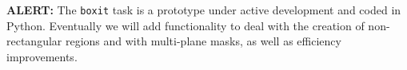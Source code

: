 {\bf ALERT:} The {\tt boxit} task is a prototype under active development and
coded in Python. Eventually we will add functionality to deal with the creation of
non-rectangular regions and with multi-plane masks, as well as efficiency
improvements.  %

%
%
%
